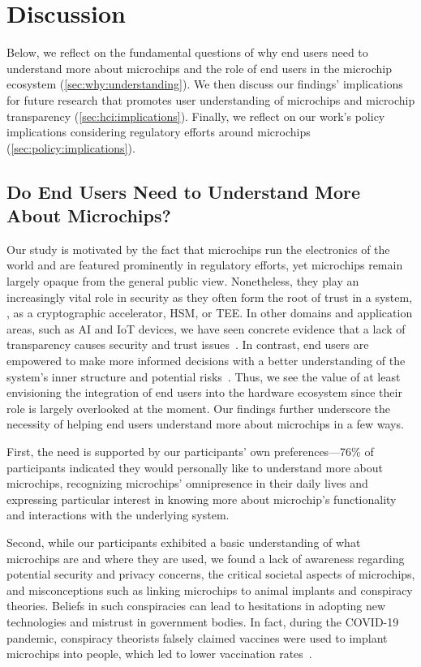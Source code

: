 \section{Discussion}
\label{xhw_study::sec::discussion}

Below, we reflect on the fundamental questions of why end users need to understand more about microchips and the role of end users in the microchip ecosystem (\autoref{sec:why:understanding}). 
We then discuss our findings' implications for future research that promotes user understanding of microchips and microchip transparency (\autoref{sec:hci:implications}). 
Finally, we reflect on our work's policy implications considering regulatory efforts around microchips (\autoref{sec:policy:implications}).


\subsection{Do End Users Need to Understand More About Microchips?}
\label{sec:why:understanding}
Our study is motivated by the fact that microchips run the electronics of the world and are featured prominently in regulatory efforts, yet microchips remain largely opaque from the general public view.
Nonetheless, they play an increasingly vital role in security as they often form the root of trust in a system, \eg, as a cryptographic accelerator, \ac{HSM}, or \ac{TEE}.
In other domains and application areas, such as \acs{AI} and \ac{IoT} devices, we have seen concrete evidence that a lack of transparency causes security and trust issues~\cite{von2021transparency}. 
In contrast, end users are empowered to make more informed decisions with a better understanding of the system's inner structure and potential risks~\cite{emami2020ask,johnson2020impact}. 
Thus, we see the value of at least envisioning the integration of end users into the hardware ecosystem since their role is largely overlooked at the moment.
Our findings further underscore the necessity of helping end users understand more about microchips in a few ways. 

First, the need is supported by our participants' own preferences---76\% of participants indicated they would personally like to understand more about microchips, recognizing microchips' omnipresence in their daily lives and expressing particular interest in knowing more about microchip's functionality and interactions with the underlying system. 

Second, while our participants exhibited a basic understanding of what microchips are and where they are used, we found a lack of awareness regarding potential security and privacy concerns, the critical societal aspects of microchips, and misconceptions such as linking microchips to animal implants and conspiracy theories. 
Beliefs in such conspiracies can lead to hesitations in adopting new technologies and mistrust in government bodies.
In fact, during the COVID-19 pandemic, conspiracy theorists falsely claimed vaccines were used to implant microchips into people, which led to lower vaccination rates~\cite{ROMER2020113356,ULLAH202193}.

